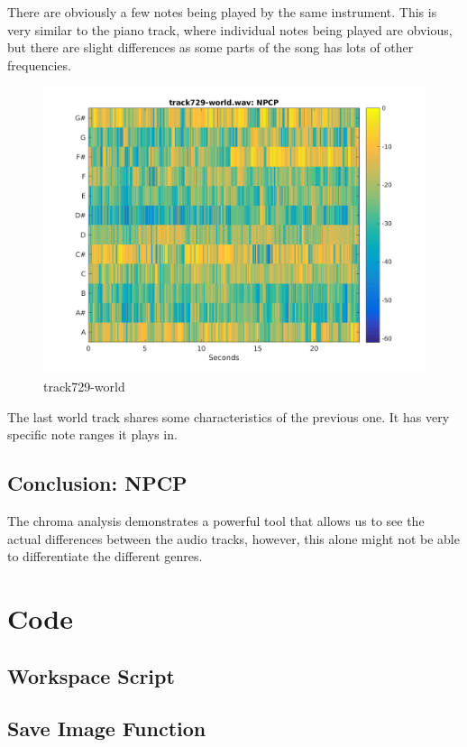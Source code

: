 \documentclass[11pt, a4paper]{article}
\begin{document}
There are obviously a few notes being played by the same instrument. This is very similar to the piano track, where individual notes being played are obvious, but there are slight differences as some parts of the song has lots of other frequencies.
\begin{figure}[H]
    \centering
    \includegraphics[width=.8\textwidth]{track729-world-NPCP.png}
    \caption{track729-world}
\end{figure}

The last world track shares some characteristics of the previous one. It has very specific note ranges it plays in. 

\subsection{Conclusion: NPCP}

The chroma analysis demonstrates a powerful tool that allows us to see the actual differences between the audio tracks, however, this alone might not be able to differentiate the different genres.

\appendix

\section{Code}

\subsection{Workspace Script}


\subsection{Save Image Function}

\end{document}

